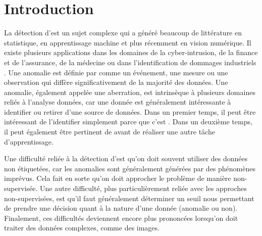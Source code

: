 \chapter*{Introduction}         %
\label{chap:introduction}       %


La détection d'\DIFdelbegin {}\DIFdelend \DIFaddbegin {}\DIFaddend est un sujet complexe qui a généré beaucoup de littérature en statistique,  en apprentissage machine et plus récemment en vision numérique. Il existe plusieurs applications \DIFdelbegin {}\DIFdelend \DIFaddbegin {}\DIFaddend dans les domaines de la cyber-intrusion, de la finance et de l'assurance, de la médecine ou dans l'identification de dommages industriels \DIFdelbegin {}\DIFdelend \DIFaddbegin {}\DIFaddend . Une anomalie est définie par \cite{Zimek2017} comme un événement, une mesure ou une observation qui diffère significativement de la majorité des données. Une anomalie, \DIFdelbegin {}\DIFdelend également appelée une aberration, est \DIFdelbegin {}\DIFdelend \DIFaddbegin {}\DIFaddend intrinsèque à plusieurs domaines reliés à l'analyse \DIFdelbegin {}\DIFdelend \DIFaddbegin {}\DIFaddend données, car une \DIFdelbegin {}\DIFdelend donnée \DIFaddbegin {}\DIFaddend est généralement intéressante à identifier ou retirer d'une source de données. Dans un premier temps, il peut être intéressant de l'identifier simplement parce que c'est  \DIFdelbegin {}\DIFdelend \DIFaddbegin {}\DIFaddend . Dans un deuxième temps, il peut également être pertinent de \DIFdelbegin {}\DIFdelend \DIFaddbegin {}\DIFaddend avant de réaliser une autre tâche d'apprentissage. 

Une difficulté reliée à la détection d'\DIFdelbegin {}\DIFdelend \DIFaddbegin {}\DIFaddend est qu'on doit souvent utiliser des données non étiquetées, car les anomalies sont généralement générées par des phénomènes imprévus. Cela fait en sorte qu'on doit approcher le problème de manière non-supervisée. Une autre difficulté, plus particulièrement reliée avec les approches non-supervisées, est qu'il faut généralement déterminer un seuil nous permettant de prendre une décision quant à la nature d'une donnée (anomalie ou non). Finalement, ces difficultés deviennent encore plus prononcées lorsqu'on doit traiter des données complexes, comme des images.


